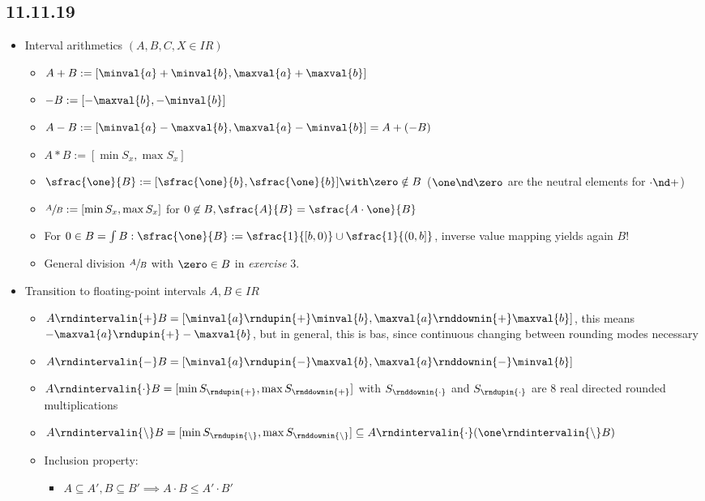 \subsection*{11.11.19}
\begin{itemize}
	\item Interval arithmetics $(A,B,C,X\in IR)$
	\begin{itemize}
		\item $A+B:=[\minval{a}+\minval{b},\maxval{a}+\maxval{b}]$
		\item $-B:=[-\maxval{b},-\minval{b}]$
		\item $A-B:=[\minval{a}-\maxval{b},\maxval{a}-\minval{b}]=A+(-B)$
		\item $A*B:=[\min S_x,\max S_x]$
		\item $\sfrac{\one}{B}:=[\sfrac{\one}{b},\sfrac{\one}{b}] \with \zero\notin B$ ($\one \nd \zero$ are the neutral elements for $\cdot \nd +$)
		\item $\sfrac{A}{B}:=[\min S_x, \max S_x]$ for $0\not \in B, \sfrac{A}{B}=\sfrac{A \cdot \one}{B}$
		\item For $0\in B=\int B: \sfrac{\one}{B}:=\sfrac{1}{[b,0)}\cup \sfrac{1}{(0,b]}$, inverse value mapping yields again $B$!
		\item General division $\sfrac{A}{B}$ with $\zero\in B$ in \emph{exercise} 3.
	\end{itemize}
	\item Transition to floating-point intervals $A,B \in IR$
	\begin{itemize}
		\item $A\rndintervalin{+}B=[\minval{a} \rndupin{+} \minval{b},\maxval{a}\rnddownin{+} \maxval{b}]$, this means $- \maxval{a} \rndupin{+} - \maxval{b}$, but in general, this is bas, since continuous changing between rounding modes necessary
		\item $A\rndintervalin{-}B=[\minval{a}\rndupin{-} \maxval{b},\maxval{a}\rnddownin{-} \minval{b}]$
		\item $A\rndintervalin{\cdot}B=[\min S_{\rndupin{+}}, \max S_{\rnddownin{+}}]$ with $S_{\rnddownin{\cdot}}$ and $S_{\rndupin{\cdot}}$ are 8 real directed rounded multiplications
		\item $A\rndintervalin{\setminus}B=[\min S_{\rndupin{\setminus}}, \max S_{\rnddownin{\setminus}}]\subseteq A\rndintervalin{\cdot}(\one \rndintervalin{\setminus}B)$
		\item Inclusion property:
		\begin{itemize}
			\item $A\subseteq A', B\subseteq B' \implies A\cdot B\le A' \cdot B'$

\end{itemize}
\end{itemize}
\end{itemize}

